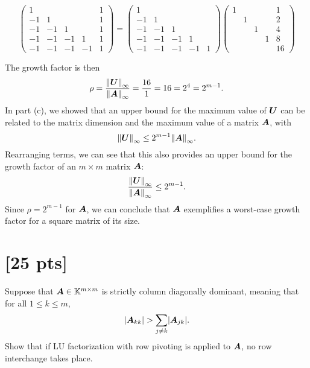 \documentclass[twoside,10pt]{article}
\begin{document}
\begin{equation}
  \begin{pmatrix}
    1  &    &   &       & 1 \\
    -1 & 1  &   &       & 1 \\
    -1 & -1 & 1 &       & 1 \\
    -1 & -1 & -1 &    1 & 1 \\
    -1 & -1 & -1 &  - 1 & 1 
  \end{pmatrix}
  =
  \begin{pmatrix}
    1  &    &   &        \\
    -1 & 1  &   &        \\
    -1 & -1 & 1 &        \\
    -1 & -1 & -1 &    1  \\
    -1 & -1 & -1 &  - 1 & 1 
  \end{pmatrix}
  \begin{pmatrix}
    1  &   &   &   & 1 \\
       & 1 &   &   & 2 \\
       &   & 1 &   & 4 \\
       &   &   & 1 & 8 \\
       &   &   &   & 16 
  \end{pmatrix}
\end{equation}

The growth factor is then
$$\rho = \dfrac{\left\| \mtx{U} \right\|_{\infty}}{\left\|\mtx{A}\right\|_{\infty}} = \dfrac{16}{1} = 16 = 2^4 = 2^{m - 1}.$$
In part (c), we showed that an upper bound for the maximum value of $\bm{U}$ can be related to the matrix dimension and the maximum value of a matrix $\bm{A}$, with
$$\left\|\mtx{U}\right\|_{\infty} \leq 2^{m - 1} \left\| \mtx{A}\right\|_{\infty}.$$
Rearranging terms, we can see that this also provides an upper bound for the growth factor of an $m \times m$ matrix $\bm{A}$:
$$\dfrac{\left\|\mtx{U}\right\|_{\infty}}{\left\| \mtx{A}\right\|_{\infty}} \leq 2^{m - 1}.$$
Since $\rho = 2^{m-1}$ for $\bm{A}$, we can conclude that $\bm{A}$ exemplifies a worst-case growth factor for a square matrix of its size.

\section{[25 pts]}
Suppose that $\bm{A} \in \mathbb{K}^{m \times m}$ is strictly column diagonally dominant, meaning that for all $1 \leq k \leq m$, 
\begin{equation}
  \left|\mtx{A}_{kk}\right| > \sum \limits_{j \neq k} \left|\mtx{A}_{jk}\right|.
\end{equation}
Show that if LU factorization with row pivoting is applied to $\bm{A}$, no row interchange takes place.
\end{document}
